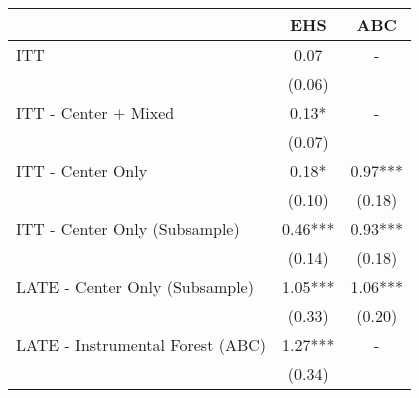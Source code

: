 \begin{tabular}{lcc}
\toprule 
\midrule 
 & EHS & ABC \\
\midrule 
ITT & 0.07 & - \\
 & (0.06) \\
ITT - Center $+$ Mixed & 0.13* & - \\
 & (0.07) \\
ITT - Center Only & 0.18* & 0.97*** \\
 & (0.10) & (0.18) \\
ITT - Center Only (Subsample) & 0.46*** & 0.93*** \\
 & (0.14) & (0.18) \\
LATE - Center Only (Subsample) & 1.05*** & 1.06*** \\
 & (0.33) & (0.20) \\
LATE - Instrumental Forest (ABC) & 1.27*** & - \\
 & (0.34) \\
\midrule 
\bottomrule 
\end{tabular}
